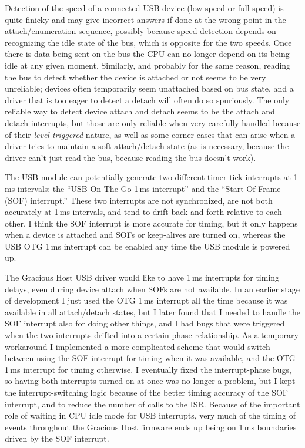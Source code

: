 Detection of the speed of a connected USB device (low-speed or full-speed)
is quite finicky and may give incorrect answers if done at the wrong point
in the attach/enumeration sequence, possibly because speed detection depends
on recognizing the idle state of the bus, which is opposite for the two
speeds.  Once there is data being sent on the bus the CPU can no longer
depend on its being idle at any given moment.  Similarly, and probably for
the same reason, reading the bus to detect whether the device is attached or
not seems to be very unreliable; devices often temporarily seem unattached
based on bus state, and a driver that is too eager to detect a detach will
often do so spuriously.  The only reliable way to detect device attach and
detach seems to be the attach and detach interrupts, but those are only
reliable when very carefully handled because of their \emph{level triggered}
nature, as well as some corner cases that can arise when a driver tries to
maintain a soft attach/detach state (as is necessary, because the driver
can't just read the bus, because reading the bus doesn't work).

The USB module can potentially generate two different timer tick interrupts
at 1\,ms intervals: the ``USB On The Go 1\,ms interrupt'' and the ``Start Of
Frame (SOF) interrupt.'' These two interrupts are not synchronized, are not
both accurately at 1\,ms intervals, and tend to drift back and forth
relative to each other.  I think the SOF interrupt is more accurate for
timing, but it only happens when a device is attached and SOFs or
keep-alives are turned on, whereas the USB OTG 1\,ms interrupt can be
enabled any time the USB module is powered up.

The Gracious Host USB driver would like to have 1\,ms interrupts for timing
delays, even during device attach when SOFs are not available.  In an
earlier stage of development I just used the OTG 1\,ms interrupt all the
time because it was available in all attach/detach states, but I later found
that I needed to handle the SOF interrupt also for doing other things, and I
had bugs that were triggered when the two interrupts drifted into a certain
phase relationship.  As a temporary workaround I implemented a more
complicated scheme that would switch between using the SOF interrupt for
timing when it was available, and the OTG 1\,ms interrupt for timing
otherwise.  I eventually fixed the interrupt-phase bugs, so having both
interrupts turned on at once was no longer a problem, but I kept the
interrupt-switching logic because of the better timing accuracy of the SOF
interrupt, and to reduce the number of calls to the ISR.  Because of the
important role of waiting in CPU idle mode for USB interrupts, very much of
the timing of events throughout the Gracious Host firmware ends up being
on 1\,ms boundaries driven by the SOF interrupt.


